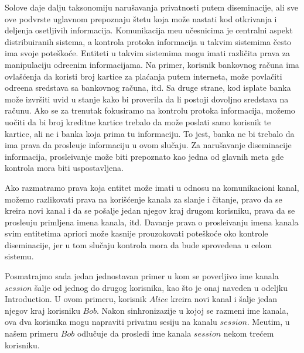Solove daje dalju taksonomiju naru\v savanja privatnosti putem diseminacije, ali sve ove podvrste uglavnom prepoznaju \v stetu koja mo\v ze nastati kod otkrivanja i deljenja osetljivih informacija. Komunikacija me\dj u u\v cesnicima je centralni aspekt distribuiranih sistema, a kontrola protoka informacija u takvim sistemima \v cesto ima svoje pote\v sko\' ce. Entiteti u takvim sistemima mogu imati razli\v cita prava za manipulaciju odre\dj enim informacijama. Na primer, %
korisnik bankovnog ra\v cuna ima ovla\v s\' cenja da koristi broj kartice za pla\' canja putem interneta, mo\v ze povla\v citi odre\dj ena sredstava sa bankovnog ra\v cuna, itd. Sa druge strane, kod isplate banka mo\v ze izvr\v siti uvid u stanje kako bi proverila da li postoji dovoljno sredstava na ra\v cunu. Ako se za trenutak fokusiramo na kontrolu protoka informacija, mo\v zemo uo\v citi da bi broj kreditne kartice trebalo da mo\v ze poslati samo korisnik te kartice, ali ne i banka koja prima tu informaciju. To jest, banka ne bi trebalo da ima prava da prosle\dj uje informaciju u ovom slu\v caju. Za naru\v savanje diseminacije informacija, prosle\dj ivanje mo\v ze biti prepoznato kao jedna od glavnih meta gde kontrola mora biti uspostavljena.



Ako razmatramo prava koja entitet mo\v ze imati u odnosu na komunikacioni kanal, mo\v zemo razlikovati prava na kori\v s\' cenje kanala za slanje i \v citanje, pravo da se kreira novi kanal i da se po\v salje jedan njegov kraj drugom korisniku, prava da se prosle\dj uju primljena imena kanala, itd. Davanje prava o prosle\dj ivanju imena kanala svim entitetima apriori mo\v ze kasnije prouzokovati pote\v sko\' ce oko kontrole diseminacije, jer u tom slu\v caju kontrola mora da bude sprovedena u celom sistemu.

Posmatrajmo sada jedan jednostavan primer u kom se poverljivo ime kanala $\mathit{session}$ \v salje od jednog do drugog korisnika, kao \v sto je onaj naveden u odeljku Introduction. U ovom primeru, korisnik  $\mathit{Alice}$ kreira novi kanal i \v salje jedan njegov kraj korisniku $\mathit{Bob}$. Nakon sinhronizazije u kojoj se razmeni ime kanala, ova dva korisnika mogu napraviti privatnu sesiju na kanalu $\mathit{session}$.  
Me\dj utim, u na\v sem primeru $\mathit{Bob}$ odlu\v cuje da prosledi ime kanala $\mathit{session}$ nekom tre\' cem korisniku.

